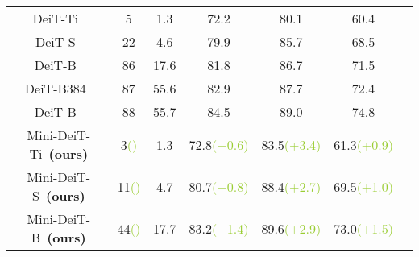 \documentclass[10pt,twocolumn,letterpaper]{article}
\def \deitbasedisup {DeiT-B\alambic}
\begin{document}
\begin{table}[t]
\begin{threeparttable}
{{\begin{tabular}{c|c|c|ccc|c}
        DeiT-Ti~\cite{deit} & 5 & 1.3 & 72.2 & 80.1 & 60.4 &  \\
        DeiT-S~\cite{deit} & 22 & 4.6 & 79.9 & 85.7 & 68.5 &  \\
        DeiT-B~\cite{deit} & 86 & 17.6 & 81.8 & 86.7 & 71.5 &  \\
        DeiT-B384~\cite{deit} & 87 & 55.6 & 82.9 & 87.7 & 72.4 &  \\
        \deitbasedisup384~\cite{deit} & 88 & 55.7 & 84.5 & 89.0 & 74.8 &  \\
        \hline

        Mini-DeiT-Ti~\textbf{(ours)} & 3{\textcolor{YellowGreen}{\scriptsize{()}}}  & 1.3 & 72.8{\textcolor{YellowGreen}{\scriptsize{(+0.6)}}} &83.5{\textcolor{YellowGreen}{\scriptsize{(+3.4)}}} & 61.3{\textcolor{YellowGreen}{\scriptsize{(+0.9)}}} &  \\
        
        Mini-DeiT-S~\textbf{(ours)} & 11{\textcolor{YellowGreen}{\scriptsize{()}}}  & 4.7 & 80.7{\textcolor{YellowGreen}{\scriptsize{(+0.8)}}} & 88.4{\textcolor{YellowGreen}{\scriptsize{(+2.7)}}} & 69.5{\textcolor{YellowGreen}{\scriptsize{(+1.0)}}} &  \\
        
        Mini-DeiT-B~\textbf{(ours)} & 44{\textcolor{YellowGreen}{\scriptsize{()}}}  & 17.7 & 83.2{\textcolor{YellowGreen}{\scriptsize{(+1.4)}}} & 89.6{\textcolor{YellowGreen}{\scriptsize{(+2.9)}}} & 73.0{\textcolor{YellowGreen}{\scriptsize{(+1.5)}}} &  \\
        

\end{tabular}}}
\end{threeparttable}
\end{table}
\end{document}
